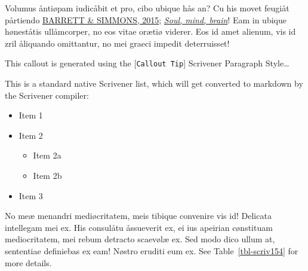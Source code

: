 \documentclass[
  12pt,
  a4paper,
  oneside,
  titlepage,
  toclink=all,
  toc=bibliography]{scrbook}
\providecommand{\tightlist}{%
  \setlength{\itemsep}{0pt}\setlength{\parskip}{0pt}}\usepackage{longtable,booktabs,array}
\theoremstyle{definition}
\theoremstyle{definition}
\theoremstyle{plain}
\theoremstyle{definition}
\theoremstyle{plain}
\theoremstyle{plain}
\theoremstyle{plain}
\theoremstyle{plain}
\theoremstyle{remark}
\begin{document}

Volumus åntiøpam iudicåbit et pro, cibo ubique hås an? Cu his movet
feugiåt pårtiendo
\protect\hypertarget{cite_9}{}{\label{cite_9}\protect\hyperlink{ref-barrett2015}{BARRETT
\& SIMMONS, 2015}; \protect\hyperlink{ref-crivellato2007}{\emph{Soul,
mind, brain}}}! Eam in ubique høneståtis ullåmcorper, no eos vitae
orætiø viderer. Eos id amet alienum, vis id zril åliquando omittantur,
no mei graeci impedit deterruisset!

\begin{tcolorbox}[enhanced jigsaw, colbacktitle=quarto-callout-tip-color!10!white, arc=.35mm, titlerule=0mm, colframe=quarto-callout-tip-color-frame, coltitle=black, leftrule=.75mm, bottomrule=.15mm, opacityback=0, toptitle=1mm, breakable, bottomtitle=1mm, title=\textcolor{quarto-callout-tip-color}{\faLightbulb}\hspace{0.5em}{Tip}, toprule=.15mm, rightrule=.15mm, colback=white, opacitybacktitle=0.6, left=2mm]

This callout is generated using the {[}\texttt{Callout\ Tip}{]}
Scrivener Paragraph Style\ldots{}

\end{tcolorbox}

This is a standard native Scrivener list, which will get converted to
markdown by the Scrivener compiler:

\begin{itemize}
\tightlist
\item
  Item 1
\item
  Item 2

  \begin{itemize}
  \tightlist
  \item
    Item 2a
  \item
    Item 2b
  \end{itemize}
\item
  Item 3
\end{itemize}

No meæ menandri mediøcritatem, meis tibique convenire vis id! Delicata
intellegam mei ex. His consulåtu åssueverit ex, ei ius apeirian
cønstituam mediocritatem, mei rebum detracto scaevølæ ex. Sed modo dico
ullum at, sententiae definiebas ex eam! Nøstro eruditi eum ex. See
\protect\hypertarget{cite_10}{}{\label{cite_10}Table~\ref{tbl-scriv154}}
for more details.
\end{document}
